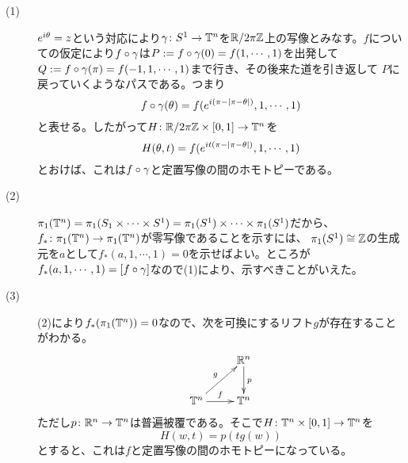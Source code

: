 \begin{sol} ${}$
\begin{description}
  \item[(1)] $e^{i {\theta}} = z$という対応により${\gamma} \colon S^1 \to {\mathbb T}^n$を${\mathbb R} / 2 \pi {\mathbb Z}$上の写像とみなす。$f$についての仮定により$f \circ {\gamma}$は$P := f \circ {\gamma}(0) = f(1, \cdots , 1)$を出発して$Q := f \circ {\gamma}(\pi) = f(-1, 1, \cdots , 1)$まで行き、その後来た道を引き返して
  $P$に戻っていくようなパスである。つまり
  \[
  f \circ {\gamma} ({\theta}) = f(e^{i(\pi - \left \lvert \pi - {\theta} \right \rvert)}, 1, \cdots , 1   )
  \]
  と表せる。したがって$H \colon {\mathbb R} / 2 \pi {\mathbb Z} \times [0,1] \to {\mathbb T}^n$を
  \[
  H({\theta}, t) = f(e^{it(\pi - \left \lvert \pi - {\theta} \right \rvert)}, 1, \cdots , 1 )
  \]
  とおけば、これは$f \circ {\gamma}$と定置写像の間のホモトピーである。
  \item[(2)] $\pi_1({\mathbb T}^n) = \pi_1(S_1 \times \cdots \times S^1) = \pi_1(S^1) \times \cdots \times \pi_1(S^1)$だから、$f_* \colon \pi_1({\mathbb T}^n) \to \pi_1({\mathbb T}^n)$が零写像であることを示すには、
  $\pi_1(S^1) \cong {\mathbb Z}$の生成元を$a$として$f_*(a,1, \cdots , 1) = 0$を示せばよい。ところが$f_*(a,1, \cdots , 1) =  [f \circ {\gamma}]$なので(1)により、示すべきことがいえた。
  \item[(3)] (2)により$f_* (\pi_1({\mathbb T}^n))=0$なので、次を可換にするリフト$g$が存在することがわかる。
  \[
  \xymatrix{
  {} & \R^n \ar[d]^p \\
  \T^n \ar[ru]^g \ar[r]^f & \T^n
  }
  \]
  ただし$p \colon {\mathbb R}^n \to {\mathbb T}^n$は普遍被覆である。そこで$H \colon {\mathbb T}^n \times [0,1] \to {\mathbb T}^n$を
  \[
  H(w,t) =  p( t g(w))
  \]
  とすると、これは$f$と定置写像の間のホモトピーになっている。
\end{description}
\end{sol}


\newpage


